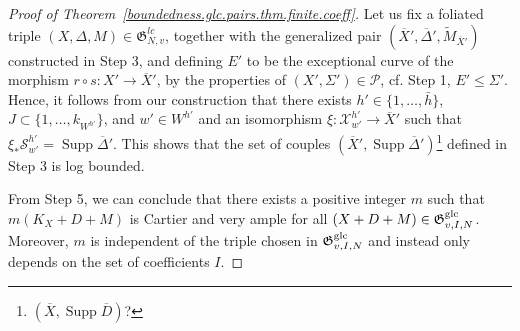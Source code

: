 \documentclass[12pt, a4paper]{amsart}
\DeclareMathOperator{\supp}{Supp}
\newcommand{\setgenpair}[1]{\mathfrak G^{#1}_{N,v}}
\newcommand{\setgpairsdcc}[1]{\mathfrak G^{\rm g#1}_{v, I, N}}
\newcounter{Theorem}
\theoremstyle{definition}
\theoremstyle{named}
\begin{document}
\begin{proof}[Proof of Theorem~\ref{boundedness.glc.pairs.thm.finite.coeff}]
Let us fix a foliated triple 
$(X, \Delta, M) \in \setgenpair{lc}$, 
together with the generalized pair
$(\overline X', \overline \Delta', \widetilde{M}_{\overline X'})$
constructed in Step 3, 
and defining 
$E'$
to be the exceptional curve of the morphism 
$r \circ s \colon X' \to \overline{X}'$, 
by the properties of 
$(X', \Sigma') \in \mathcal P$, 
cf. Step 1, 
$E' \leq \Sigma'$.
Hence, it follows from our construction that there exists 
$h' \in \{1, \dots, \bar h\}$, 
$J \subset \{1, \dots, k_{W^{h'}}\}$, 
and 
$w' \in W^{h'}$
and an isomorphism
$\xi \colon 
\mathcal X^{h'}_{w'} \to \overline{X}'$
such that 
$\xi_\ast \mathcal S^{h'}_{w'}= \supp \overline{\Delta}'$.
This shows that the set of couples  
$(\overline X', \supp \overline \Delta')$\footnote{$(\overline X, \supp \overline D)$?}
defined in Step 3 is log bounded.

\fi
\medskip

From Step 5, we can conclude that there exists a positive integer 
$m$ such that 
$m(K_X+D+M)$ 
is Cartier and very ample
for all 
$(X+D+M) \in \setgpairsdcc{lc}$.
Moreover, 
$m$ 
is independent of the triple chosen in 
$\setgpairsdcc{lc}$ and instead only depends 
on the set of coefficients $I$.

\medskip



\end{proof}
\end{document}
